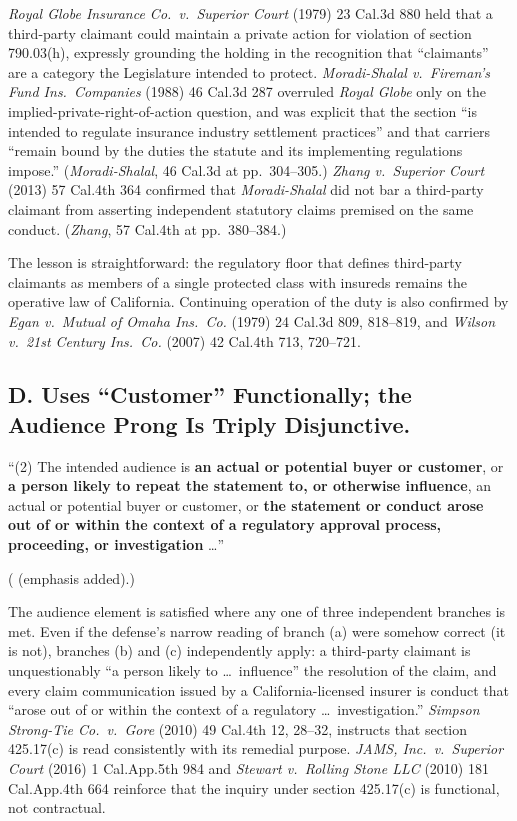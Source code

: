 \textit{Royal Globe Insurance Co.\ v.\ Superior Court} (1979) 23 Cal.3d 880 held that a third-party claimant could maintain a private action for violation of section 790.03(h), expressly grounding the holding in the recognition that ``claimants'' are a category the Legislature intended to protect. \textit{Moradi-Shalal v.\ Fireman's Fund Ins.\ Companies} (1988) 46 Cal.3d 287 overruled \textit{Royal Globe} only on the implied-private-right-of-action question, and was explicit that the section ``is intended to regulate insurance industry settlement practices'' and that carriers ``remain bound by the duties the statute and its implementing regulations impose.'' (\textit{Moradi-Shalal}, 46 Cal.3d at pp.\ 304--305.) \textit{Zhang v.\ Superior Court} (2013) 57 Cal.4th 364 confirmed that \textit{Moradi-Shalal} did not bar a third-party claimant from asserting independent statutory claims premised on the same conduct. (\textit{Zhang}, 57 Cal.4th at pp.\ 380--384.)

The lesson is straightforward: the regulatory floor that defines third-party claimants as members of a single protected class with insureds remains the operative law of California. Continuing operation of the duty is also confirmed by \textit{Egan v.\ Mutual of Omaha Ins.\ Co.} (1979) 24 Cal.3d 809, 818--819, and \textit{Wilson v.\ 21st Century Ins.\ Co.} (2007) 42 Cal.4th 713, 720--721.

\subsection*{D.  Uses ``Customer'' Functionally; the Audience Prong Is Triply Disjunctive.}

\begin{quoting}
``(2) The intended audience is \textbf{an actual or potential buyer or customer}, or \textbf{a person likely to repeat the statement to, or otherwise influence}, an actual or potential buyer or customer, or \textbf{the statement or conduct arose out of or within the context of a regulatory approval process, proceeding, or investigation} \dots''
\end{quoting}
\begin{flushright}
\small ( (emphasis added).)
\end{flushright}

The audience element is satisfied where any one of three independent branches is met. Even if the defense's narrow reading of branch (a) were somehow correct (it is not), branches (b) and (c) independently apply: a third-party claimant is unquestionably ``a person likely to \dots~influence'' the resolution of the claim, and every claim communication issued by a California-licensed insurer is conduct that ``arose out of or within the context of a regulatory \dots~investigation.'' \textit{Simpson Strong-Tie Co.\ v.\ Gore} (2010) 49 Cal.4th 12, 28--32, instructs that section 425.17(c) is read consistently with its remedial purpose. \textit{JAMS, Inc.\ v.\ Superior Court} (2016) 1 Cal.App.5th 984 and \textit{Stewart v.\ Rolling Stone LLC} (2010) 181 Cal.App.4th 664 reinforce that the inquiry under section 425.17(c) is functional, not contractual.

